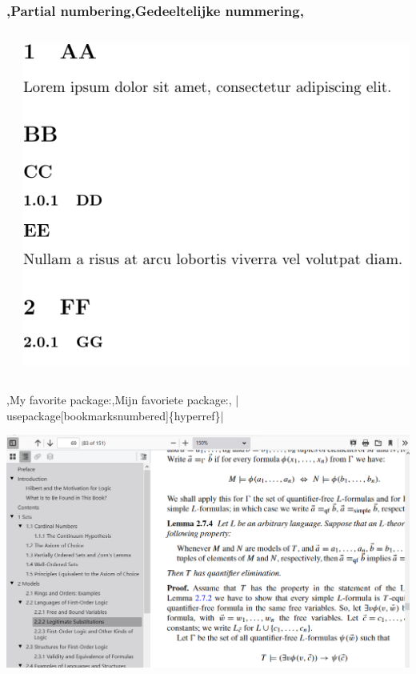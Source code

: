 \begin{frame}
    \frametitle{\lang,Partial numbering,Gedeeltelijke nummering,}
    
    \begin{columns}
        \begin{column}{0.5\textwidth}
        \end{column}
        \begin{column}{0.5\textwidth}
            \includegraphics[width=\linewidth,height=0.8\textheight,keepaspectratio]{assets/partialNumberedStars.pdf}
        \end{column}
    \end{columns}
\end{frame}

\begin{frame}{%
    \lang,My favorite package:,Mijn favoriete package:, \hll|\\usepackage[bookmarksnumbered]\{hyperref\}|}

\includegraphics[height=0.8\textheight,width=\linewidth,keepaspectratio]{assets/3_Documentstructuur/hyperref2.png}

\end{frame}

